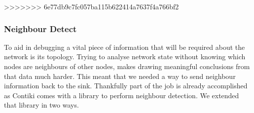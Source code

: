 >>>>>>> 6e77db9c7fc057ba115b622414a7637f4a766bf2

\begin{figure}[ht!]
\centering
{}

\end{figure}

\subsubsection{Neighbour Detect}

To aid in debugging a vital piece of information that will be required about the network is its topology. Trying to analyse network state without knowing which nodes are neighbours of other nodes, makes drawing meaningful conclusions from that data much harder. This meant that we needed a way to send neighbour information back to the sink. Thankfully part of the job is already accomplished as Contiki comes with a library to perform neighbour detection\cite{?}. We extended that library in two ways.

